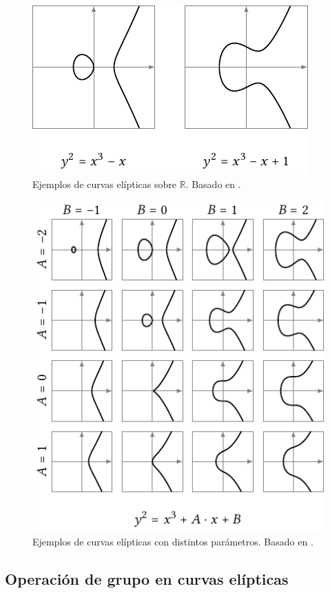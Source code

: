 \documentclass[
  a4paper,
  12pt,
  spanish,
]{scrartcl}
\begin{document}
\begin{figure}[h]
  \centering
  \includegraphics[width=.75\textwidth]{img/ejemplos-curvas}
  \caption{Ejemplos de curvas elípticas sobre $\mathbb{R}$. Basado en \parencite{eichlseder_elliptic_2016}.}
  \label{fig:curva}
\end{figure}

\begin{figure}[h]
  \centering
  \includegraphics[width=.75\textwidth]{img/parametros-curvas}
  \caption{Ejemplos de curvas elípticas con distintos parámetros. Basado en  \parencite{eichlseder_elliptic_2016}.}
  \label{fig:parametros}
\end{figure}

\subsection{Operación de grupo en curvas elípticas}
\end{document}
